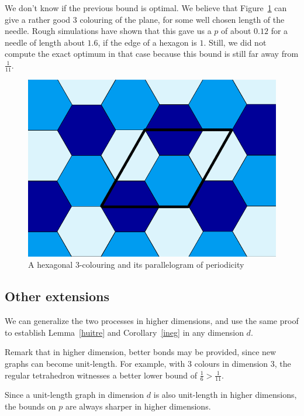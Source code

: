 \documentclass[a4paper,11pt]{article}
\theoremstyle{definition}
\theoremstyle{remark}
\begin{document}
We don't know if the previous bound is optimal. We believe that Figure~\ref{trois} 
can give a rather good $3$ colouring of the plane, for some well chosen length 
of the needle. Rough simulations have shown that this gave us a $p$ of about 
$0.12$ for a needle of length about $1.6$, if the edge of a hexagon is $1$. 
Still, we did not compute the exact optimum in that case because this bound is 
still far away from $\frac{1}{11}$.

\begin{figure}[h]
\center
\includegraphics[scale=0.5]{trois.png}
\caption{\label{trois} A hexagonal $3$-colouring and its parallelogram of periodicity}
\end{figure}

\subsection{Other extensions}
\label{dim}
We can generalize the two processes in higher dimensions, and use the same 
proof to establish Lemma~\ref{huitre} and Corollary~\ref{ineg} in any 
dimension $d$.


Remark that in higher dimension, better bonds may be provided, since new graphs can 
become unit-length. For example, with $3$ colours in dimension $3$, the regular 
tetrahedron witnesses a better lower bound 
of $\frac 1 6 >\frac 1 {11}$.

Since a unit-length graph in dimension $d$ is also
unit-length in higher dimensions, the bounds on $p$ are always sharper in higher
dimensions.
\end{document}
